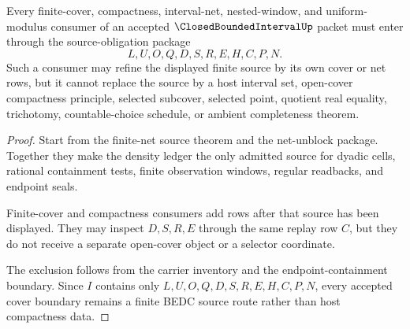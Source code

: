 \begin{theorem}
\label{thm:closed-bounded-interval-source-cover-boundary}
Every finite-cover, compactness, interval-net, nested-window, and uniform-modulus consumer of an accepted $\ClosedBoundedIntervalUp$ packet must enter through the source-obligation package
$$
L,U,O,Q,D,S,R,E,H,C,P,N.
$$
Such a consumer may refine the displayed finite source by its own cover or net rows, but it cannot replace the source by a host interval set, open-cover compactness principle, selected subcover, selected point, quotient real equality, trichotomy, countable-choice schedule, or ambient completeness theorem.
\end{theorem}
\begin{proof}
Start from the finite-net source theorem and the net-unblock package. Together they make the density ledger the only admitted source for dyadic cells, rational containment tests, finite observation windows, regular readbacks, and endpoint seals.

Finite-cover and compactness consumers add rows after that source has been displayed. They may inspect $D,S,R,E$ through the same replay row $C$, but they do not receive a separate open-cover object or a selector coordinate.

The exclusion follows from the carrier inventory and the endpoint-containment boundary. Since $I$ contains only $L,U,O,Q,D,S,R,E,H,C,P,N$, every accepted cover boundary remains a finite BEDC source route rather than host compactness data.
\end{proof}

